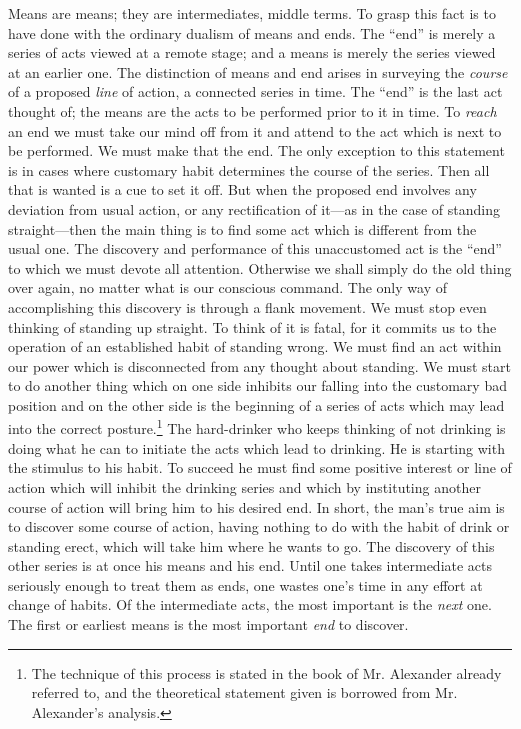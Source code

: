 \documentclass[12pt]{article}
\begin{document}
Means are means; they are intermediates, middle
terms. To grasp this fact is to have done with the
ordinary dualism of means and ends. The ``end'' is
merely a series of acts viewed at a remote stage; and
a means is merely the series viewed at an earlier one.
The distinction of means and end arises in surveying
the \emph{course} of a proposed \emph{line} of action, a connected
series in time. The ``end'' is the last act thought of;
the means are the acts to be performed prior to it in
time. To \emph{reach} an end we must take our mind off from
it and attend to the act which is next to be performed.
We must make that the end. The only exception to
this statement is in cases where customary habit determines
the course of the series. Then all that is
wanted is a cue to set it off. But when the proposed
end involves any deviation from usual action, or any
rectification of it---as in the case of standing straight---then
the main thing is to find some act which is different
from the usual one. The discovery and performance
of this unaccustomed act is the ``end'' to
which we must devote all attention. Otherwise we shall
simply do the old thing over again, no matter what is
our conscious command. The only way of accomplishing
this discovery is through a flank movement. We
must stop even thinking of standing up straight. To
think of it is fatal, for it commits us to the operation of
an established habit of standing wrong. We must find
an act within our power which is disconnected from any
thought about standing. We must start to do another
thing which on one side inhibits our falling into the
customary bad position and on the other side is the
beginning of a series of acts which may lead into the
correct posture.\footnote{The technique of this process is stated in the book of Mr. Alexander already referred to, and the theoretical statement given is borrowed from Mr. Alexander's analysis.} The hard-drinker who keeps thinking
of not drinking is doing what he can to initiate the
acts which lead to drinking. He is starting with the
stimulus to his habit. To succeed he must find some
positive interest or line of action which will inhibit the
drinking series and which by instituting another course
of action will bring him to his desired end. In short,
the man's true aim is to discover some course of action,
having nothing to do with the habit of drink or standing
erect, which will take him where he wants to go.
The discovery of this other series is at once his means
and his end. Until one takes intermediate acts seriously
enough to treat them as ends, one wastes one's
time in any effort at change of habits. Of the intermediate
acts, the most important is the \emph{next} one. The
first or earliest means is the most important \emph{end} to
discover.
\end{document}
